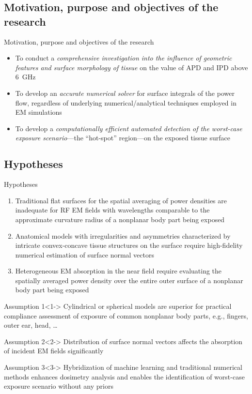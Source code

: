 \documentclass[xcolor=dvipsnames,10pt]{beamer}
\begin{document}
\subsection{Motivation, purpose and objectives of the research}
\begin{frame}{Motivation, purpose and objectives of the research}
    \begin{itemize}
        \item To conduct a \emph{comprehensive investigation into the influence of geometric features and surface morphology of tissue} on the value of APD and IPD above \SI{6}{\GHz}
        \item To develop an \emph{accurate numerical solver} for surface integrals of the power flow, regardless of underlying numerical/analytical techniques employed in EM simulations
        \item To develop a \emph{computationally efficient automated detection of the worst-case exposure scenario}---the ``hot-spot'' region---on the exposed tissue surface
    \end{itemize}
\end{frame}

\subsection{Hypotheses}
\begin{frame}{Hypotheses}
    \begin{enumerate}
        \item<only@1> Traditional flat surfaces for the spatial averaging of power densities are inadequate for RF EM fields with wavelengths comparable to the approximate curvature radius of a nonplanar body part being exposed
        \item<only@2> Anatomical models with irregularities and asymmetries characterized by intricate convex-concave tissue structures on the surface require high-fidelity numerical estimation of surface normal vectors
        \item<only@3> Heterogeneous EM absorption in the near field require evaluating the spatially averaged power density over the entire outer surface of a nonplanar body part being exposed
    \end{enumerate}
    \begin{block}{Assumption 1}<1->
        Cylindrical or spherical models are superior for practical compliance assessment of exposure of common nonplanar body parts, e.g., fingers, outer ear, head, \dots
    \end{block}
    \begin{block}{Assumption 2}<2->
        Distribution of surface normal vectors affects the absorption of incident EM fields significantly 
    \end{block}
    \begin{block}{Assumption 3}<3->
        Hybridization of machine learning and traditional numerical methods enhances dosimetry analysis and enables the identification of worst-case exposure scenario without any priors
    \end{block}
\end{frame}
\end{document}
